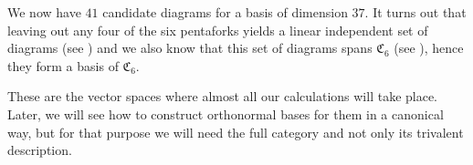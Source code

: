	We now have $41$ candidate diagrams for a basis of dimension $37$. It turns out that leaving out any four of the six pentaforks yields a linear independent set of diagrams (see \cite[Proof of Proposition 6.4]{Morrison2017}) and we also know that this set of diagrams spans $\mathfrak{C}_6$ (see \cite[Lemma 6.25]{Morrison2017}), hence they form a basis of $\mathfrak{C}_6$.
	
	These are the vector spaces where almost all our calculations will take place. Later, we will see how to construct orthonormal bases for them in a canonical way, but for that purpose we will need the full category and not only its trivalent description.
	